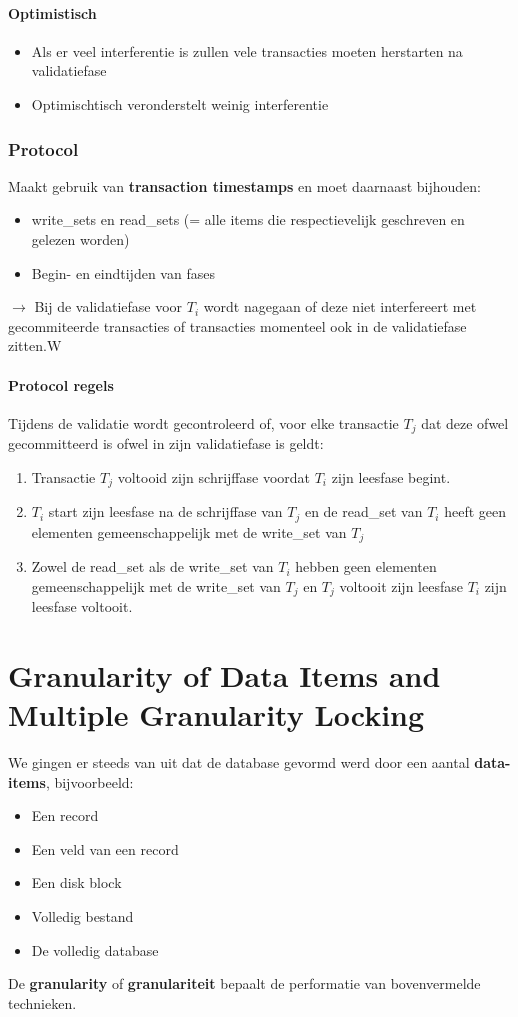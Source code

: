 \paragraph{Optimistisch}
\begin{itemize}
	\item Als er veel interferentie is zullen vele transacties moeten herstarten na validatiefase
	\item Optimischtisch veronderstelt weinig interferentie
\end{itemize}

\subsubsection{Protocol}
Maakt gebruik van \textbf{transaction timestamps} en moet daarnaast bijhouden:
\begin{itemize}
	\item write\_sets en read\_sets (= alle items die respectievelijk geschreven en gelezen worden)
	\item Begin- en eindtijden van fases
\end{itemize}
$\rightarrow$ Bij de validatiefase voor $T_i$ wordt nagegaan of deze niet interfereert met gecommiteerde transacties of transacties momenteel ook in de validatiefase zitten.W
\paragraph{Protocol regels}
Tijdens de validatie wordt gecontroleerd of, voor elke transactie $T_j$ dat deze ofwel gecommitteerd is ofwel in zijn validatiefase is geldt:
\begin{enumerate}
	\item Transactie $T_j$ voltooid zijn schrijffase voordat $T_i$ zijn leesfase begint.
	\item $T_i$ start zijn leesfase na de schrijffase van $T_j$ en de read\_set van $T_i$ heeft geen elementen gemeenschappelijk met de write\_set van $T_j$
	\item Zowel de read\_set als de write\_set van $T_i$ hebben geen elementen gemeenschappelijk met de write\_set van $T_j$ en $T_j$ voltooit zijn leesfase $T_i$ zijn leesfase voltooit.
\end{enumerate}



\section{Granularity of Data Items and Multiple Granularity Locking}%
We gingen er steeds van uit dat de database gevormd werd door een aantal \textbf{data-items}, bijvoorbeeld:
\begin{itemize}
	\item Een record
	\item Een veld van een record
	\item Een disk block
	\item Volledig bestand
	\item De volledig database
\end{itemize}
De \textbf{granularity} of \textbf{granulariteit} bepaalt de performatie van bovenvermelde technieken.


